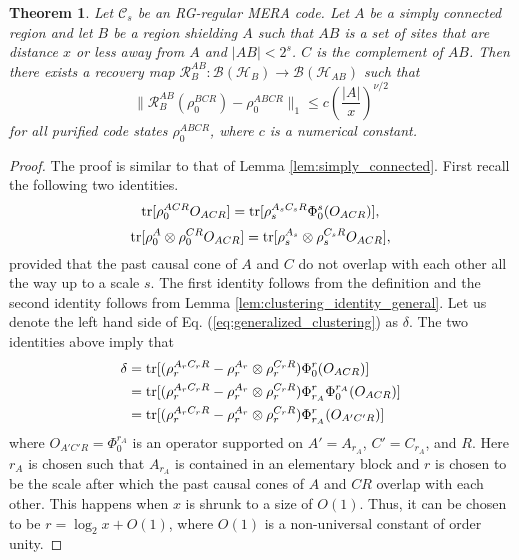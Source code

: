\documentclass[a4paper,11pt]{article}
\newcommand{\1}{\mathbbm{1}}
\newcommand{\cC}{\mathcal{C}}
\newcommand{\tr}{{\rm tr}}
\newtheorem{thm}{Theorem}
\begin{document}
\begin{thm}\label{thm:local_correctability}
	Let $\cC_s$ be an RG-regular MERA code. Let $A$ be a simply connected region and let $B$ be a region shielding $A$ such that $AB$ is a set of sites that are distance $x$
	or less away from $A$ and $|AB|<2^s$.
	 $C$ is the complement of $AB$. Then there exists a recovery map $\mathcal{R}_{B}^{AB}: \mathcal{B}(\mathcal{H}_B) \to \mathcal{B}(\mathcal{H}_{AB})$ such that
	\begin{equation}
		\|\mathcal{R}_{B}^{AB}(\rho_0^{BCR}) - \rho_0^{ABCR} \|_1 \leq c\left(\frac{|A|}{x} \right)^{\nu/2} \label{eq:generalized_clustering}
	\end{equation}
	for all purified code states $\rho_0^{ABCR}$,
	where $c$ is a numerical constant.
\end{thm}
\begin{proof}
The proof is similar to that of Lemma \ref{lem:simply_connected}. First recall the following two identities.
\begin{equation}
\tr[\rho_0^{ACR}O_{ACR}]=\tr[\rho_s^{A_sC_sR}\Phi_0^s(O_{ACR})],
\end{equation}
\begin{equation}
\tr[\rho_0^{A}\otimes \rho_0^{CR}O_{ACR}] = \tr[\rho_s^{A_s}\otimes \rho_s^{C_sR} O_{ACR}],
\end{equation}
provided that the past causal cone of $A$ and $C$ do not overlap with each other all the way up to a scale $s.$
The first identity follows from the definition and the second identity follows from Lemma \ref{lem:clustering_identity_general}. Let us denote the left hand side of Eq. (\ref{eq:generalized_clustering}) as $\delta$. The two identities above imply that
\begin{align}
\delta &= \tr[(\rho_r^{A_rC_rR} - \rho_r^{A_r}\otimes \rho_r^{C_rR}) \Phi_0^r(O_{ACR})]\\
&=\tr[(\rho_r^{A_rC_rR} - \rho_r^{A_r}\otimes \rho_r^{C_rR})\Phi_{r_A}^{r}\Phi_0^{r_A}(O_{ACR})] \\
&= \tr[(\rho_r^{A_rC_rR} - \rho_r^{A_r}\otimes \rho_r^{C_rR})\Phi_{r_A}^{r}(O_{A'C'R})]
\end{align}
where $O_{A'C'R}=\Phi_{0}^{r_A}$ is an operator supported on $A'=A_{r_A}$, $C'=C_{r_A}$, and $R$. Here $r_A$ is chosen such that $A_{r_A}$ is contained in an elementary block and $r$ is chosen to be the scale after which the past causal cones of $A$ and $CR$ overlap with each other. This happens when $x$ is shrunk to a size of $O(1)$. Thus, it can be chosen to be $r=\log_2 x +O(1)$, where $O(1)$ is a non-universal constant of order unity.


\end{proof}
\end{document}
